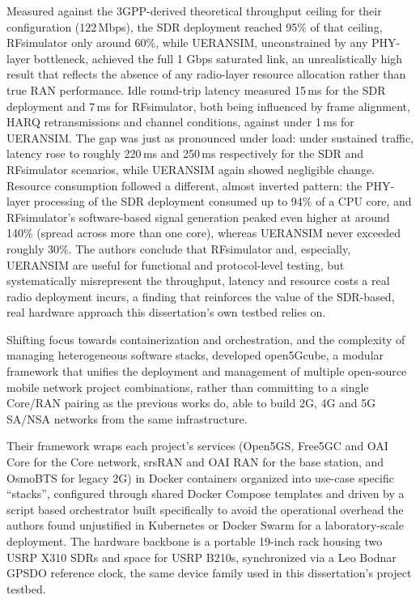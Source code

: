 Measured against the 3GPP-derived theoretical throughput ceiling for their configuration (122\,Mbps), the \gls{SDR} deployment reached 95\% of that ceiling, RFsimulator only around 60\%, while UERANSIM, unconstrained by any \gls{PHY}-layer bottleneck, achieved the full 1 Gbps saturated link, an unrealistically high result that reflects the absence of any radio-layer resource allocation rather than true \gls{RAN} performance. Idle round-trip latency measured 15\,ms for the \gls{SDR} deployment and 7\,ms for RFsimulator, both being influenced by frame alignment, HARQ retransmissions and channel conditions, against under 1\,ms for UERANSIM. The gap was just as pronounced under load: under sustained traffic, latency rose to roughly 220\,ms and 250\,ms respectively for the \gls{SDR} and RFsimulator scenarios, while UERANSIM again showed negligible change. Resource consumption followed a different, almost inverted pattern: the \gls{PHY}-layer processing of the \gls{SDR} deployment consumed up to 94\% of a CPU core, and RFsimulator's software-based signal generation peaked even higher at around 140\% (spread across more than one core), whereas UERANSIM never exceeded roughly 30\%. The authors conclude that RFsimulator and, especially, UERANSIM are useful for functional and protocol-level testing, but systematically misrepresent the throughput, latency and resource costs a real radio deployment incurs, a finding that reinforces the value of the \gls{SDR}-based, real hardware approach this dissertation's own testbed relies on.

Shifting focus towards containerization and orchestration, and the complexity of managing heterogeneous software stacks, \textcite{horstmann2025open5gcube} developed open5Gcube, a modular framework that unifies the deployment and management of multiple open-source mobile network project combinations, rather than committing to a single Core/\gls{RAN} pairing as the previous works do, able to build 2G, 4G and 5G \gls{SA}/\gls{NSA} networks from the same infrastructure.

Their framework wraps each project's services (Open5GS, Free5GC and \gls{OAI} Core for the Core network, srsRAN and \gls{OAI} \gls{RAN} for the base station, and OsmoBTS for legacy 2G) in Docker containers organized into use-case specific ``stacks'', configured through shared Docker Compose templates and driven by a script based orchestrator built specifically to avoid the operational overhead the authors found unjustified in Kubernetes or Docker Swarm for a laboratory-scale deployment. The hardware backbone is a portable 19-inch rack housing two USRP X310 \glspl{SDR} and space for USRP B210s, synchronized via a Leo Bodnar \gls{GPSDO} reference clock, the same device family used in this dissertation's project testbed.

